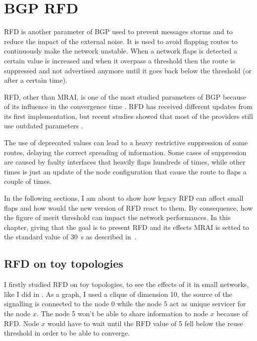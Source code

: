 \chapter{BGP RFD}
\label{cha:bgp_rfd}

\ac{RFD} is another parameter of \ac{BGP} used to prevent messages storms
and to reduce the impact of the external noise.
It is used to avoid flapping routes to continuously make the network unstable.
When a network flaps is detected a certain value is increased and when it overpass a threshold
then the route is suppressed and not advertised anymore until it goes back
below the threshold (or after a certain time).

\ac{RFD}, other than \ac{MRAI}, is one of the most studied parameters of \ac{BGP}
because of its influence in the convergence time \cite{mao2002route,pelsser2011route}.
\ac{RFD} has received different updates from its first implementation, but recent
studies showed that most of the providers still use outdated parameters \cite{gray2020bgp}.

The use of deprecated values can lead to a heavy restrictive suppression
of some routes, delaying the correct spreading of information.
Some cases of suppression are caused by faulty interfaces that heavily flaps hundreds of times,
while other times is just an update of the node configuration that
cause the route to flaps a couple of times.

In the following sections, I am about to show how legacy \ac{RFD} can affect
small flaps and how would the new version of \ac{RFD} react to them.
By consequence, how the figure of merit threshold can impact the network
performances.
In this chapter, giving that the goal is to present \ac{RFD} and its effects
\ac{MRAI} is setted to the standard value of \SI{30}{\second} as described
in~\cite{rfc4271}.

\section{RFD on toy topologies}
\label{sec:rfd_toy_topologies}


I firstly studied \ac{RFD} on toy topologies, to see the effects of it in small
networks, like I did in .
As a graph, I used a clique of dimension \num{10}, the source of the signalling
is connected to the node \num{0} while the node \num{5} act as unique servicer
for the node $x$.
The node \num{5} won't be able to share information to node $x$ because of \ac{RFD}.
Node $x$ would have to wait until the \ac{RFD} value of \num{5} fell below
the reuse threshold in order to be able to converge.

